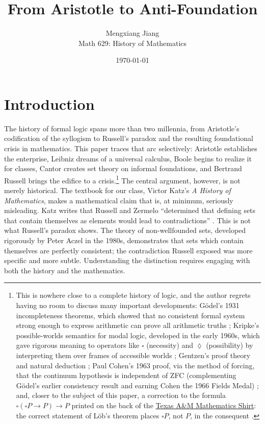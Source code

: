 \documentclass[12pt]{article}
\title{From Aristotle to Anti-Foundation}
\author{Mengxiang Jiang\\
Math 629: History of Mathematics}
\date{\today}
\theoremstyle{definition}
\begin{document}
\maketitle

\section{Introduction}

The history of formal logic spans more than two millennia, from Aristotle's codification of the syllogism to Russell's paradox and the resulting foundational crisis in mathematics. This paper traces that arc selectively: Aristotle establishes the enterprise, Leibniz dreams of a universal calculus, Boole begins to realize it for classes, Cantor creates set theory on informal foundations, and Bertrand Russell brings the edifice to a crisis.\footnote{This is nowhere close to a complete history of logic, and the author regrets having no room to discuss many important developments: G\"{o}del's 1931 incompleteness theorems, which showed that no consistent formal system strong enough to express arithmetic can prove all arithmetic truths \cite{godel_1931}; Kripke's possible-worlds semantics for modal logic, developed in the early 1960s, which gave rigorous meaning to operators like $\square$ (necessity) and $\lozenge$ (possibility) by interpreting them over frames of accessible worlds \cite{kripke_completeness}; Gentzen's proof theory and natural deduction \cite{gentzen_1935}; Paul Cohen's 1963 proof, via the method of forcing, that the continuum hypothesis is independent of ZFC (complementing G\"{o}del's earlier consistency result and earning Cohen the 1966 Fields Medal) \cite{cohen_1963}; and, closer to the subject of this paper, a correction to the formula $\square(\square P \rightarrow P) \rightarrow P$ printed on the back of the \href{https://github.com/lucianchauvin/Texas-A-M-Mathematics-Shirt}{Texas A\&M Mathematics Shirt}: the correct statement of L\"{o}b's theorem places $\square P$, not $P$, in the consequent \cite{lob_1955}.} The central argument, however, is not merely historical. The textbook for our class, Victor Katz's \emph{A History of Mathematics}, makes a mathematical claim that is, at minimum, seriously misleading. Katz writes that Russell and Zermelo ``determined that defining sets that contain themselves as elements would lead to contradictions'' \cite{katz}. This is not what Russell's paradox shows. The theory of non-wellfounded sets, developed rigorously by Peter Aczel in the 1980s, demonstrates that sets which contain themselves are perfectly consistent; the contradiction Russell exposed was more specific and more subtle. Understanding the distinction requires engaging with both the history and the mathematics.
\end{document}
